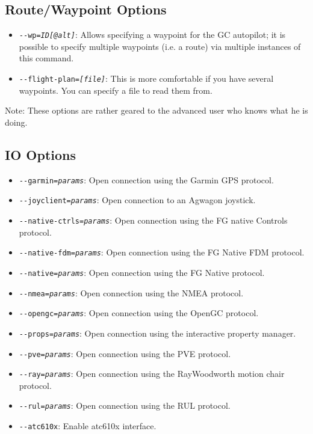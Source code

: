\subsection{Route/Waypoint Options}
\begin{itemize}
\item{\texttt{-$ $-wp={\it ID[@alt]}}}: Allows specifying a waypoint for the GC autopilot; it
is possible to specify multiple waypoints (i.e. a route) via multiple instances of this
command.
\item{\texttt{-$ $-flight-plan={\it [file]}}}: This is more comfortable if
you have several waypoints. You can  specify a file to read them from.
\end{itemize}

Note: These options are rather geared to the advanced user who knows what he is doing. 

\subsection{IO Options}
\begin{itemize}
\item{\texttt{-$ $-garmin={\it params}}}: Open connection using the Garmin GPS protocol.
\item{\texttt{-$ $-joyclient={\it params}}}: Open connection to an Agwagon joystick.
\item{\texttt{-$ $-native-ctrls={\it params}}}: Open connection using the FG native Controls protocol.
\item{\texttt{-$ $-native-fdm={\it params}}}: Open connection using the FG Native FDM protocol.
\item{\texttt{-$ $-native={\it params}}}: Open connection using the FG Native protocol.
\item{\texttt{-$ $-nmea={\it params}}}: Open connection using the NMEA protocol.
\item{\texttt{-$ $-opengc={\it params}}}: Open connection using the OpenGC protocol.
\item{\texttt{-$ $-props={\it params}}}: Open connection using the interactive property manager.
\item{\texttt{-$ $-pve={\it params}}}: Open connection using the PVE protocol.
\item{\texttt{-$ $-ray={\it params}}}: Open connection using the RayWoodworth motion chair protocol.
\item{\texttt{-$ $-rul={\it params}}}: Open connection using the RUL protocol.
\item{\texttt{-$ $-atc610x}}: Enable atc610x interface.
\end{itemize}

